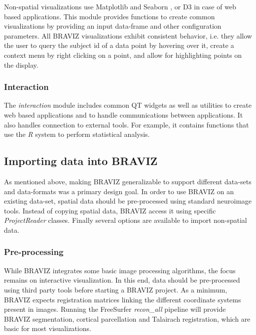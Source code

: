 \documentclass{frontiersHLTH}
\begin{document}
Non-spatial visualizations use Matplotlib \cite{hunter_matplotlib:_2007} and Seaborn \cite{michael_waskom_seaborn:_2015}, or D3  \cite{bostock_d3_2011} in case of web based applications. This module provides functions to create common visualizations by providing an input data-frame and other configuration parameters. All BRAVIZ visualizations exhibit consistent behavior, i.e. they  allow the user to query the subject id of a data point by hovering over it, create a context menu by right clicking on a point, and allow for highlighting points on the display. 

\subsubsection{Interaction}

The \emph{interaction} module includes common QT widgets as well as utilities to create web based applications and to handle communications between applications. It also handles connection to external tools. For example, it contains functions that use the \emph{R} system to perform statistical analysis. 

\subsection{Importing data into BRAVIZ}

As mentioned above, making BRAVIZ generalizable to support different data-sets and data-formats was a primary design goal.
In order to use BRAVIZ on an existing data-set, spatial data should be pre-processed using standard neuroimage tools. Instead of copying spatial data, BRAVIZ access it using specific \emph{ProjectReader} classes. Finally several options are available to import non-spatial data.

\subsubsection{Pre-processing}

While BRAVIZ integrates some basic image processing algorithms, the focus remains on interactive visualization. In this end,  data should be pre-processed using third party tools before starting a BRAVIZ project. As a minimum, BRAVIZ expects registration matrices linking the different coordinate systems present in images. Running the FreeSurfer \emph{recon\_all} pipeline will provide BRAVIZ segmentation, cortical parcellation and Talairach registration, which are basic for most visualizations. 
\end{document}
